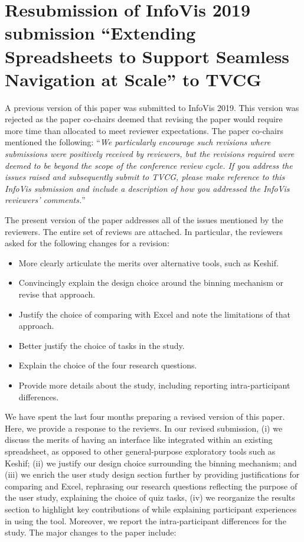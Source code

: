 

\section*{Resubmission of InfoVis 2019 submission ``Extending Spreadsheets to Support Seamless
Navigation at Scale'' to TVCG}

A previous version of this paper was submitted to InfoVis 2019. This version was rejected as the paper co-chairs deemed that revising the paper would require more time than allocated to meet reviewer expectations. The paper co-chairs mentioned the following: ``\textit{We particularly encourage such revisions where submissions were positively received by reviewers, but the revisions required were deemed to be beyond the scope of the conference review cycle. If you address the issues raised and subsequently submit to TVCG, please make reference to this  InfoVis submission and include a description of how you addressed the InfoVis reviewers' comments.}'' 

The present version of the paper addresses all of the issues mentioned by the reviewers. The entire set of reviews are attached. In particular, the reviewers asked for the following changes for a revision: 
\begin{itemize}
    \item More clearly articulate the merits over alternative tools, such as Keshif. 
     \item Convincingly explain the design choice around the binning mechanism or revise
    that approach.
    \item Justify the choice of comparing with Excel and note the limitations of that
    approach.
     \item Better justify the choice of tasks in the study. 
     \item Explain the choice of the four research questions.
     \item Provide more details about the study, including reporting intra-participant
    differences.
\end{itemize} 
We have spent the last four months 
preparing a revised version of this paper.
Here, we provide a response to the reviews. 
In our revised submission,
(i) we discuss the merits of having an interface like \noah
integrated within an existing spreadsheet, as opposed
to other general-purpose exploratory tools such as  Keshif;
(ii) we justify our design choice surrounding the binning mechanism;
and 
(iii) we enrich the user study design section further 
by providing justifications for comparing \noah and Excel, 
rephrasing our research questions reflecting the purpose of the user study, explaining the choice of quiz tasks,
(iv) we reorganize the results section to  highlight key contributions of \noah while explaining participant experiences in using the tool. Moreover, we report the  intra-participant differences for the study. 
The major changes to the paper include:

